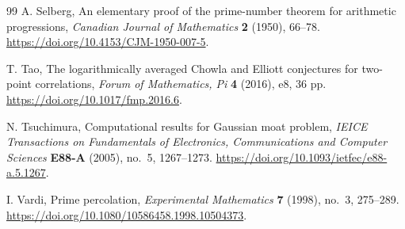 \begin{thebibliography}{99}
A. Selberg,
An elementary proof of the prime-number theorem for arithmetic progressions,
\emph{Canadian Journal of Mathematics} \textbf{2} (1950), 66--78.
\url{https://doi.org/10.4153/CJM-1950-007-5}.

T. Tao,
The logarithmically averaged Chowla and Elliott conjectures for two-point correlations,
\emph{Forum of Mathematics, Pi} \textbf{4} (2016), e8, 36 pp.
\url{https://doi.org/10.1017/fmp.2016.6}.

N. Tsuchimura,
Computational results for Gaussian moat problem,
\emph{IEICE Transactions on Fundamentals of Electronics, Communications
and Computer Sciences} \textbf{E88-A} (2005), no.~5, 1267--1273.
\url{https://doi.org/10.1093/ietfec/e88-a.5.1267}.

I. Vardi,
Prime percolation,
\emph{Experimental Mathematics} \textbf{7} (1998), no.~3, 275--289.
\url{https://doi.org/10.1080/10586458.1998.10504373}.

\end{thebibliography}
